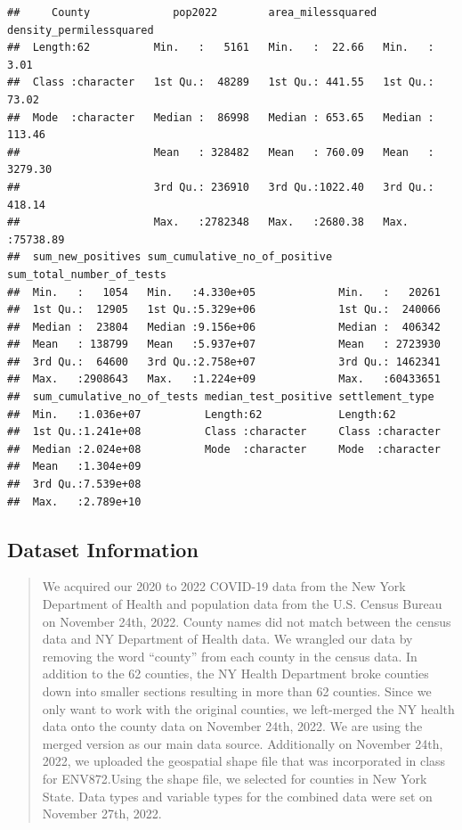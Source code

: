 \documentclass[
  12pt,
]{article}
\begin{document}
\begin{verbatim}
##     County             pop2022        area_milessquared density_permilessquared
##  Length:62          Min.   :   5161   Min.   :  22.66   Min.   :    3.01       
##  Class :character   1st Qu.:  48289   1st Qu.: 441.55   1st Qu.:   73.02       
##  Mode  :character   Median :  86998   Median : 653.65   Median :  113.46       
##                     Mean   : 328482   Mean   : 760.09   Mean   : 3279.30       
##                     3rd Qu.: 236910   3rd Qu.:1022.40   3rd Qu.:  418.14       
##                     Max.   :2782348   Max.   :2680.38   Max.   :75738.89       
##  sum_new_positives sum_cumulative_no_of_positive sum_total_number_of_tests
##  Min.   :   1054   Min.   :4.330e+05             Min.   :   20261         
##  1st Qu.:  12905   1st Qu.:5.329e+06             1st Qu.:  240066         
##  Median :  23804   Median :9.156e+06             Median :  406342         
##  Mean   : 138799   Mean   :5.937e+07             Mean   : 2723930         
##  3rd Qu.:  64600   3rd Qu.:2.758e+07             3rd Qu.: 1462341         
##  Max.   :2908643   Max.   :1.224e+09             Max.   :60433651         
##  sum_cumulative_no_of_tests median_test_positive settlement_type   
##  Min.   :1.036e+07          Length:62            Length:62         
##  1st Qu.:1.241e+08          Class :character     Class :character  
##  Median :2.024e+08          Mode  :character     Mode  :character  
##  Mean   :1.304e+09                                                 
##  3rd Qu.:7.539e+08                                                 
##  Max.   :2.789e+10
\end{verbatim}

\newpage

\hypertarget{dataset-information}{%
\subsection{Dataset Information}\label{dataset-information}}

\begin{quote}
We acquired our 2020 to 2022 COVID-19 data from the New York Department
of Health and population data from the U.S. Census Bureau on November
24th, 2022. County names did not match between the census data and NY
Department of Health data. We wrangled our data by removing the word
``county'' from each county in the census data. In addition to the 62
counties, the NY Health Department broke counties down into smaller
sections resulting in more than 62 counties. Since we only want to work
with the original counties, we left-merged the NY health data onto the
county data on November 24th, 2022. We are using the merged version as
our main data source. Additionally on November 24th, 2022, we uploaded
the geospatial shape file that was incorporated in class for
ENV872.Using the shape file, we selected for counties in New York State.
Data types and variable types for the combined data were set on November
27th, 2022.
\end{quote}
\end{document}
